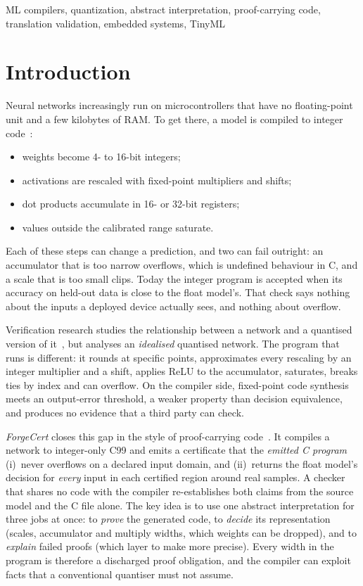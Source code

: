\documentclass[conference]{IEEEtran}
\begin{document}
\begin{IEEEkeywords}
ML compilers, quantization, abstract interpretation, proof-carrying code, translation validation, embedded systems, TinyML
\end{IEEEkeywords}

\section{Introduction}
Neural networks increasingly run on microcontrollers that have no floating-point unit and a few kilobytes of RAM. To get there, a model is compiled to integer code~\cite{jacob,tflm}:
\begin{itemize}
\item weights become 4- to 16-bit integers;
\item activations are rescaled with fixed-point multipliers and shifts;
\item dot products accumulate in 16- or 32-bit registers;
\item values outside the calibrated range saturate.
\end{itemize}
Each of these steps can change a prediction, and two can fail outright: an accumulator that is too narrow overflows, which is undefined behaviour in C, and a scale that is too small clips. Today the integer program is accepted when its accuracy on held-out data is close to the float model's. That check says nothing about the inputs a deployed device actually sees, and nothing about overflow.

Verification research studies the relationship between a network and a quantised version of it~\cite{reludiff,neurodiff,qebverif,ceg4n,qnnverif}, but analyses an \emph{idealised} quantised network. The program that runs is different: it rounds at specific points, approximates every rescaling by an integer multiplier and a shift, applies ReLU to the accumulator, saturates, breaks ties by index and can overflow. On the compiler side, fixed-point code synthesis~\cite{syfix} meets an output-error threshold, a weaker property than decision equivalence, and produces no evidence that a third party can check.

\emph{ForgeCert} closes this gap in the style of proof-carrying code~\cite{pcc}. It compiles a network to integer-only C99 and emits a certificate that the \emph{emitted C program}
(i)~never overflows on a declared input domain, and
(ii)~returns the float model's decision for \emph{every} input in each certified region around real samples.
A checker that shares no code with the compiler re-establishes both claims from the source model and the C file alone. The key idea is to use one abstract interpretation for three jobs at once: to \emph{prove} the generated code, to \emph{decide} its representation (scales, accumulator and multiply widths, which weights can be dropped), and to \emph{explain} failed proofs (which layer to make more precise). Every width in the program is therefore a discharged proof obligation, and the compiler can exploit facts that a conventional quantiser must not assume.
\end{document}
